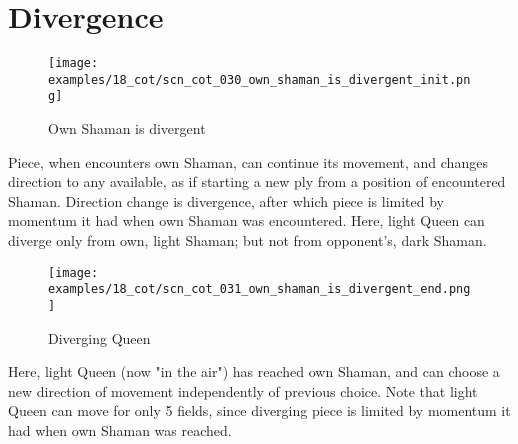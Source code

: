 \clearpage %

\section*{Divergence}
\label{sec:Conquest of Tlalocan/Divergence}

\vspace*{-1.4\baselineskip}
\noindent
\begin{figure}[!h]
\texttt{[image: examples/18\_cot/scn\_cot\_030\_own\_shaman\_is\_divergent\_init.png]}
\vspace*{-1.3\baselineskip}
\caption{Own Shaman is divergent}
\label{fig:scn_cot_030_own_shaman_is_divergent_init}
\end{figure}

\vspace*{-0.5\baselineskip}
Piece, when encounters own Shaman, can continue its movement, and changes direction
to any available, as if starting a new ply from a position of encountered Shaman.
Direction change is divergence, after which piece is limited by momentum it had when
own Shaman was encountered.\newline
\indent
Here, light Queen can diverge only from own, light Shaman; but not from opponent's,
dark Shaman.

\clearpage %

\vspace*{-2.1\baselineskip}
\noindent
\begin{figure}[!h]
\texttt{[image: examples/18\_cot/scn\_cot\_031\_own\_shaman\_is\_divergent\_end.png]}
\vspace*{-1.3\baselineskip}
\caption{Diverging Queen}
\label{fig:scn_cot_031_own_shaman_is_divergent_end}
\end{figure}

\vspace*{-0.4\baselineskip}
Here, light Queen (now "in the air") has reached own Shaman, and can choose a new
direction of movement independently of previous choice. Note that light Queen can
move for only 5 fields, since diverging piece is limited by momentum it had when
own Shaman was reached.

